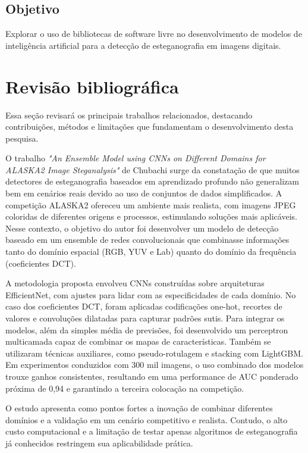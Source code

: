 \documentclass[12pt]{article}
\begin{document}
\subsection{Objetivo}

Explorar o uso de bibliotecas de software livre no desenvolvimento de modelos
de inteligência artificial para a detecção de esteganografia em imagens
digitais.

\section{Revisão bibliográfica} \label{sec:firstpage}
Essa seção revisará os principais trabalhos relacionados, destacando
contribuições, métodos e limitações que fundamentam o desenvolvimento desta
pesquisa.


O trabalho \textit{"An Ensemble Model using CNNs on Different Domains for
  ALASKA2 Image Steganalysis"} de Chubachi \cite{chubachi2020cnn} surge da
constatação de que muitos detectores de esteganografia baseados em aprendizado
profundo não generalizam bem em cenários reais devido ao uso de conjuntos de
dados simplificados. A competição ALASKA2 ofereceu um ambiente mais realista,
com imagens JPEG coloridas de diferentes origens e processos, estimulando
soluções mais aplicáveis. Nesse contexto, o objetivo do autor foi desenvolver
um modelo de detecção baseado em um ensemble de redes convolucionais que
combinasse informações tanto do domínio espacial (RGB, YUV e Lab) quanto do
domínio da frequência (coeficientes DCT).

A metodologia proposta envolveu CNNs construídas sobre arquiteturas
EfficientNet, com ajustes para lidar com as especificidades de cada domínio. No
caso dos coeficientes DCT, foram aplicadas codificações one-hot, recortes de
valores e convoluções dilatadas para capturar padrões sutis. Para integrar os
modelos, além da simples média de previsões, foi desenvolvido um perceptron
multicamada capaz de combinar os mapas de características. Também se utilizaram
técnicas auxiliares, como pseudo-rotulagem e stacking com LightGBM. Em
experimentos conduzidos com 300 mil imagens, o uso combinado dos modelos trouxe
ganhos consistentes, resultando em uma performance de AUC ponderado próxima de
0,94 e garantindo a terceira colocação na competição.

O estudo apresenta como pontos fortes a inovação de combinar diferentes
domínios e a validação em um cenário competitivo e realista. Contudo, o alto
custo computacional e a limitação de testar apenas algoritmos de esteganografia
já conhecidos restringem sua aplicabilidade prática.
\end{document}
